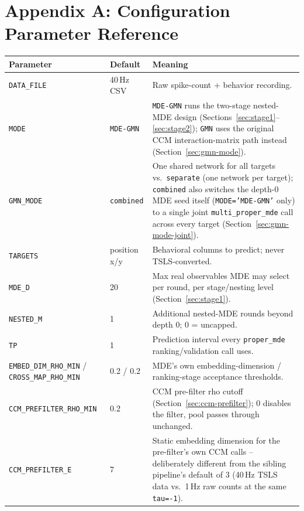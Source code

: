 \documentclass[11pt]{article}
\begin{document}
\section*{Appendix A: Configuration Parameter Reference}
\begin{longtable}{@{}>{\raggedright\arraybackslash}p{4.0cm}>{\raggedright\arraybackslash\small}p{2.6cm}>{\raggedright\arraybackslash}p{7.9cm}@{}}
\toprule
\textbf{Parameter} & \textbf{Default} & \textbf{Meaning} \\
\midrule
\endhead
\texttt{DATA\_FILE} & 40\,Hz CSV & Raw spike-count + behavior recording. \\
\texttt{MODE} & \texttt{MDE-GMN} & \texttt{MDE-GMN} runs the two-stage nested-MDE design (Sections~\ref{sec:stage1}--\ref{sec:stage2}); \texttt{GMN} uses the original CCM interaction-matrix path instead (Section~\ref{sec:gmn-mode}). \\
\texttt{GMN\_MODE} & \texttt{combined} & One shared network for all targets vs.\ \texttt{separate} (one network per target); \texttt{combined} also switches the depth-0 MDE seed itself (\texttt{MODE='MDE-GMN'} only) to a single joint \texttt{multi\_proper\_mde} call across every target (Section~\ref{sec:gmn-mode-joint}). \\
\texttt{TARGETS} & position x/y & Behavioral columns to predict; never TSLS-converted. \\
\texttt{MDE\_D} & 20 & Max real observables MDE may select per round, per stage/nesting level (Section~\ref{sec:stage1}). \\
\texttt{NESTED\_M} & 1 & Additional nested-MDE rounds beyond depth 0; 0 = uncapped. \\
\texttt{TP} & 1 & Prediction interval every \texttt{proper\_mde} ranking/validation call uses. \\
\texttt{EMBED\_DIM\_RHO\_MIN} / \texttt{CROSS\_MAP\_RHO\_MIN} & 0.2 / 0.2 & MDE's own embedding-dimension / ranking-stage acceptance thresholds. \\
\texttt{CCM\_PREFILTER\_RHO\_MIN} & 0.2 & CCM pre-filter rho cutoff (Section~\ref{sec:ccm-prefilter}); 0 disables the filter, pool passes through unchanged. \\
\texttt{CCM\_PREFILTER\_E} & 7 & Static embedding dimension for the pre-filter's own CCM calls -- deliberately different from the sibling pipeline's default of 3 (40\,Hz TSLS data vs.\ 1\,Hz raw counts at the same \texttt{tau=-1}). \\

\end{longtable}
\end{document}
